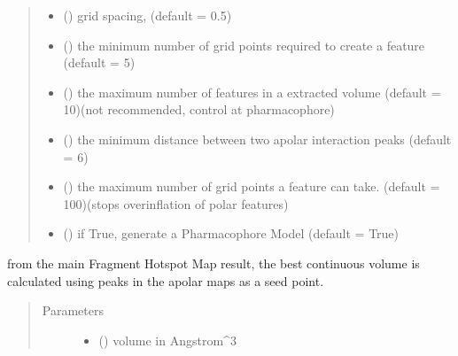 \documentclass[letterpaper,10pt,english]{sphinxmanual}
\begin{document}
\begin{fulllineitems}
\begin{fulllineitems}
\begin{quote}
\begin{description}
\begin{itemize}
\item {} 
 () \textendash{} grid spacing, (default = 0.5)

\item {} 
 () \textendash{} the minimum number of grid points required to create a feature (default = 5)

\item {} 
 () \textendash{} the maximum number of features in a extracted volume (default = 10)(not recommended, control at pharmacophore)

\item {} 
 () \textendash{} the minimum distance between two apolar interaction peaks (default = 6)

\item {} 
 () \textendash{} the maximum number of grid points a feature can take. (default = 100)(stops overinflation of polar features)

\item {} 
 () \textendash{} if True, generate a Pharmacophore Model (default = True)

\end{itemize}

\end{description}\end{quote}

\end{fulllineitems}


\begin{fulllineitems}
\label{\detokenize{result_api:hotspots.result.Extractor.extract_all_volumes}}
from the main Fragment Hotspot Map result, the best continuous volume is calculated using peaks in the apolar
maps as a seed point.
\begin{quote}\begin{description}
\item[{Parameters}] \leavevmode\begin{itemize}
\item {} 
 () \textendash{} volume in Angstrom\textasciicircum{}3


\end{itemize}
\end{description}
\end{quote}
\end{fulllineitems}
\end{fulllineitems}
\end{document}

